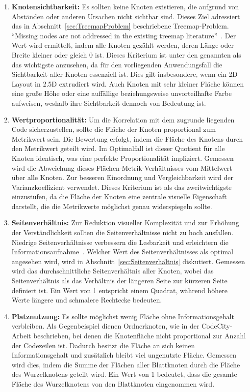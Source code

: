 \begin{enumerate}
    \item \textbf{Knotensichtbarkeit:} Es sollten keine Knoten existieren, die aufgrund von Abständen oder anderen Ursachen nicht sichtbar sind. Dieses Ziel adressiert das in Abschnitt~\ref{sec:TreemapProblem} beschriebene Treemap-Problem. \enquote{Missing nodes are not addressed in the existing treemap literature}~\cite[5]{lu2008cascaded}. Der Wert wird ermittelt, indem alle Knoten gezählt werden, deren Länge oder Breite kleiner oder gleich 0 ist. Dieses Kriterium ist unter den genannten als das wichtigste anzusehen, da für den vorliegenden Anwendungsfall die Sichtbarkeit aller Knoten essenziell ist. Dies gilt insbesondere, wenn ein 2D-Layout in 2{.}5D extrudiert wird. Auch Knoten mit sehr kleiner Fläche können eine große Höhe oder eine auffällige beziehungsweise unvorteilhafte Farbe aufweisen, weshalb ihre Sichtbarkeit dennoch von Bedeutung ist.
    
    \item \textbf{Wertproportionalität:} Um die Korrelation mit dem zugrunde liegenden Code sicherzustellen, sollte die Fläche der Knoten proportional zum Metrikwert sein. Die Bewertung erfolgt, indem die Fläche des Knotens durch den Metrikwert geteilt wird. Im Optimalfall ist dieser Quotient für alle Knoten identisch, was eine perfekte Proportionalität impliziert. Gemessen wird die Abweichung dieses Flächen-Metrik-Verhältnisses vom Mittelwert über alle Knoten. Zur besseren Einordnung und Vergleichbarkeit wird der Varianzkoeffizient verwendet. Dieses Kriterium ist als das zweitwichtigste einzustufen, da die Fläche der Knoten eine zentrale visuelle Eigenschaft darstellt, die die Metrikwerte möglichst genau widerspiegeln sollte.
    
    \item \textbf{Seitenverhältnis:} Zur Reduktion visueller Komplexität und zur Erhöhung der Verständlichkeit sollten die Seitenverhältnisse nicht zu hoch ausfallen. Niedrige Seitenverhältnisse verbessern die Lesbarkeit und erleichtern die Informationsaufnahme~\cite{bruls2000squarified}. Welcher Wert des Seitenverhältnisses als optimal angesehen wird, wird in Abschnitt~\ref{sec:Seitenverhältnis} diskutiert. Gemessen wird das durchschnittliche Seitenverhältnis aller Knoten, wobei das Seitenverhältnis als das Verhältnis der längeren Seite zur kürzeren Seite definiert ist. Ein Wert von 1 entspricht einem Quadrat, während höhere Werte längere und schmalere Rechtecke bedeuten.
    
    \item \textbf{Platznutzung:} Es sollte möglichst wenig Fläche ohne Informationsgehalt verbleiben. Als Gegenbeispiel dienen Ordnerknoten, wie in der CodeCity-Arbeit beschrieben, bei denen die Knotenfläche nicht proportional zur Anzahl der Codezeilen ist. Dadurch besitzt die Fläche an sich keinen Informationsgehalt und zusätzlich bleibt viel ungenutzte Fläche. Gemessen wird dies, indem die Summe der Flächen aller Blattknoten durch die Fläche des Wurzelknotens geteilt wird. Ein Wert von 1 bedeutet, dass die gesamte Fläche des Wurzelknotens von den Blattknoten eingenommen wird.
    

\end{enumerate}
